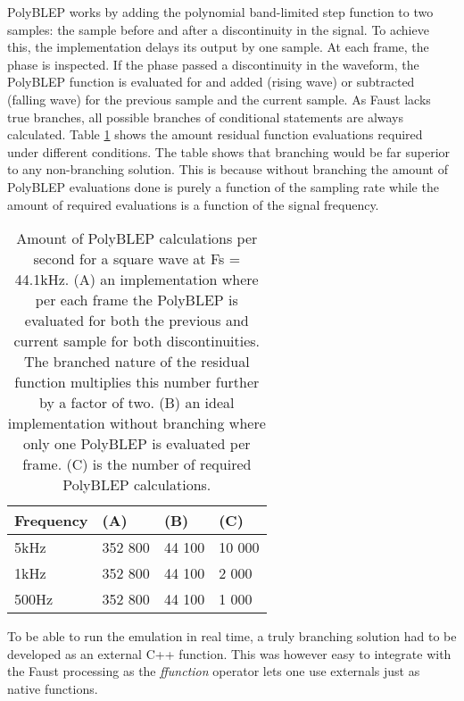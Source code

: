 \documentclass[11pt,a4paper]{article}
\begin{document}
PolyBLEP works by adding the polynomial band-limited step function to two samples: the sample before and after a discontinuity in the signal. To achieve this, the implementation delays its output by one sample. At each frame, the phase is inspected. If the phase passed a discontinuity in the waveform, the PolyBLEP function is evaluated for and added (rising wave) or subtracted (falling wave) for the previous sample and the current sample. As Faust lacks true branches, all possible branches of conditional statements are always calculated. Table \ref{table:polyblep-amount} shows the amount residual function evaluations required under different conditions. The table shows that branching would be far superior to any non-branching solution. This is because without branching the amount of PolyBLEP evaluations done is purely a function of the sampling rate while the amount of required evaluations is a function of the signal frequency. 

\begin{table}[h]
 \begin{center}
\begin{tabular}{|l|l|l|l|}

      \hline
      Frequency & (A)        &  (B)         & (C) \\
      \hline\hline
      5kHz     & 352 800     & 44 100       & 10 000\\
      1kHz     & 352 800     & 44 100       &  2 000\\
      500Hz    & 352 800     & 44 100       &  1 000\\
      \hline

\end{tabular}
\caption{Amount of PolyBLEP calculations per second for a square wave at Fs = 44.1kHz. 
(A) an implementation where per each frame the PolyBLEP is evaluated for both the previous and current sample for both discontinuities. The branched nature of the residual function multiplies this number further by a factor of two.
(B) an ideal implementation without branching where only one PolyBLEP is evaluated per frame.
(C) is the number of required PolyBLEP calculations.  }\label{table:polyblep-amount}
 \end{center}
\end{table}

To be able to run the emulation in real time, a truly branching solution had to be developed as an external C++ function. This was however easy to integrate with the Faust processing as the \emph{ffunction} operator lets one use externals just as native functions.
\end{document}
